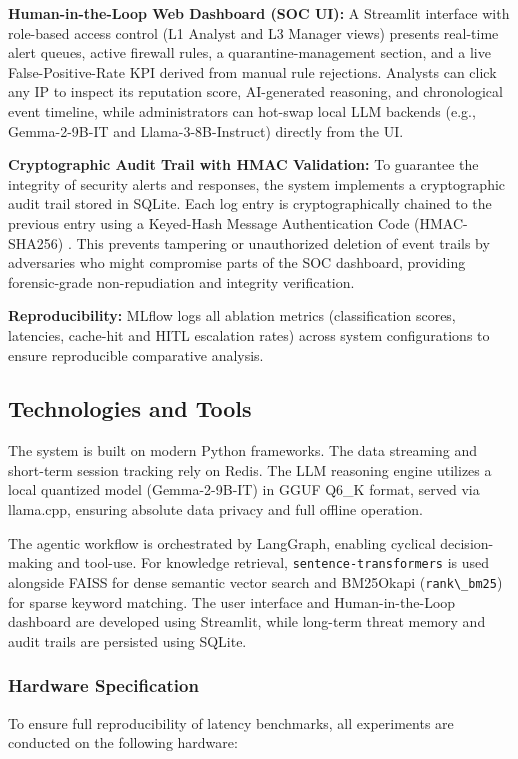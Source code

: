 \documentclass[12pt,a4paper]{article}
\begin{document}
\textbf{Human-in-the-Loop Web Dashboard (SOC UI):} A Streamlit interface with role-based access control (L1 Analyst and L3 Manager views) presents real-time alert queues, active firewall rules, a quarantine-management section, and a live False-Positive-Rate KPI derived from manual rule rejections. Analysts can click any IP to inspect its reputation score, AI-generated reasoning, and chronological event timeline, while administrators can hot-swap local LLM backends (e.g., Gemma-2-9B-IT and Llama-3-8B-Instruct) directly from the UI.

\textbf{Cryptographic Audit Trail with HMAC Validation:} To guarantee the integrity of security alerts and responses, the system implements a cryptographic audit trail stored in SQLite. Each log entry is cryptographically chained to the previous entry using a Keyed-Hash Message Authentication Code (HMAC-SHA256) \cite{hmac1997}. This prevents tampering or unauthorized deletion of event trails by adversaries who might compromise parts of the SOC dashboard, providing forensic-grade non-repudiation and integrity verification.

\textbf{Reproducibility:} MLflow logs all ablation metrics (classification scores, latencies, cache-hit and HITL escalation rates) across system configurations to ensure reproducible comparative analysis.

\subsection{Technologies and Tools}
The system is built on modern Python frameworks. The data streaming and short-term session tracking rely on Redis. The LLM reasoning engine utilizes a local quantized model (Gemma-2-9B-IT) in GGUF Q6\_K format, served via llama.cpp, ensuring absolute data privacy and full offline operation.

The agentic workflow is orchestrated by LangGraph, enabling cyclical decision-making and tool-use. For knowledge retrieval, \verb|sentence-transformers| is used alongside FAISS for dense semantic vector search and BM25Okapi (\verb|rank\_bm25|) for sparse keyword matching. The user interface and Human-in-the-Loop dashboard are developed using Streamlit, while long-term threat memory and audit trails are persisted using SQLite.

\subsubsection{Hardware Specification}
To ensure full reproducibility of latency benchmarks, all experiments are conducted on the following hardware:
\end{document}
